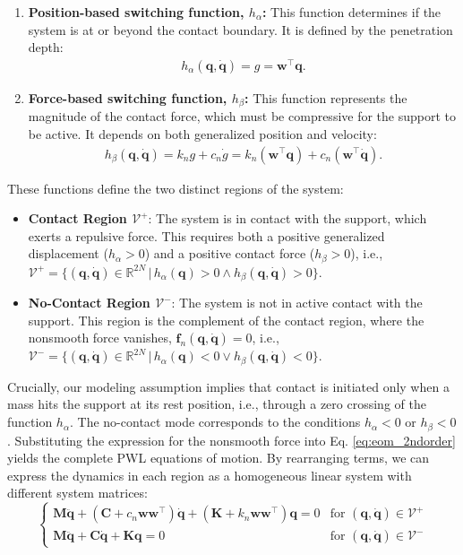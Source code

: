 \documentclass[a4paper,9pt,parskip=half,english]{article}
\theoremstyle{plain}
\theoremstyle{definition}
\newcommand{\T}{^{\!\top}} %
\newcommand{\mR}{\mathbb{R}}
\newcommand{\vf}{\mathbf f}
\newcommand{\vq}{\mathbf q}
\newcommand{\vw}{\mathbf w}
\newcommand{\vC}{\mathbf C}
\newcommand{\vK}{\mathbf K}
\newcommand{\vM}{\mathbf M}
\newcommand{\cVplus}{\mathcal{V}^+}
\newcommand{\cVminus}{\mathcal{V}^-}
\begin{document}
\begin{enumerate}
	\item \textbf{Position-based switching function, $h_{\alpha}$:} This function determines if the system is at or beyond the contact boundary. It is defined by the penetration depth:
	\begin{align}
		h_{\alpha}(\vq,\dot{\vq}) = g = \vw\T\vq.
	\end{align}
	\item \textbf{Force-based switching function, $h_{\beta}$:} This function represents the magnitude of the contact force, which must be compressive for the support to be active. It depends on both generalized position and velocity:
	\begin{align}
		h_{\beta}(\vq, \dot{\vq}) =  k_n g + c_n \dot{g} =  k_n(\vw\T\vq) + c_n(\vw\T\dot{\vq}).
	\end{align}
\end{enumerate}
These functions define the two distinct regions of the system:
\begin{itemize}
	\item \textbf{Contact Region $\cVplus$}: The system is in contact with the support, which exerts a repulsive force. This requires both a positive generalized displacement ($h_{\alpha} > 0$) and a positive contact force ($h_{\beta} > 0$), i.e., $\cVplus = \{ (\vq,\dot{\vq}) \in \mR^{2N} \, | \, h_{\alpha}(\vq) > 0 \land h_{\beta}(\vq,\dot{\vq}) >0 \}$. 
	\item \textbf{No-Contact Region $\cVminus$}: The system is not in active contact with the support. This region is the complement of the contact region, where the nonsmooth force vanishes, $\vf_n(\vq,\dot{\vq}) = 0$, i.e., $\cVminus = \{ (\vq,\dot{\vq}) \in \mR^{2N} \, | \, h_{\alpha}(\vq) < 0 \lor h_{\beta}(\vq,\dot{\vq}) < 0 \}$. 
\end{itemize}
Crucially, our modeling assumption implies that contact is initiated only when a mass hits the support at its rest position, i.e., through a zero crossing of the function $h_\alpha$. The no-contact mode corresponds to the conditions $h_\alpha<0$ or $h_\beta<0$.
Substituting the expression for the nonsmooth force into Eq. \eqref{eq:eom_2ndorder} yields the complete PWL equations of motion. By rearranging terms, we can express the dynamics in each region as a homogeneous linear system with different system matrices:
\begin{equation} \label{eq:eom_piecewise}
	\begin{cases}
		\vM\ddot{\vq} + (\vC + c_n\vw\vw\T)\dot{\vq} + (\vK + k_n\vw\vw\T)\vq = 0 & \text{for } (\vq,\dot{\vq}) \in \cVplus \\
		\vM\ddot{\vq} + \vC\dot{\vq} + \vK\vq = 0 & \text{for } (\vq,\dot{\vq}) \in \cVminus
	\end{cases}
\end{equation}
\end{document}
